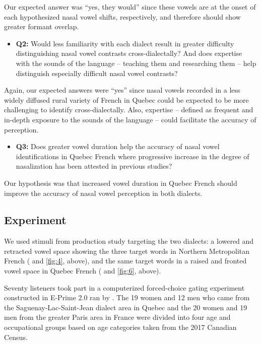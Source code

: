 \documentclass[output=paper,colorlinks,citecolor=brown]{langscibook}
\begin{document}
Our expected answer was ``yes, they would'' since these vowels are at the onset of each hypothesized nasal vowel shifts, respectively, and therefore should show greater formant overlap.

\begin{itemize}
    \item \textbf{Q2:} Would less familiarity with each dialect result in greater difficulty distinguishing nasal vowel contrasts cross-dialectally? And does expertise with the sounds of the language -- teaching them and researching them -- help distinguish especially difficult nasal vowel contrasts?
\end{itemize}

Again, our expected answers were ``yes'' since nasal vowels recorded in a less widely diffused rural variety of French in Quebec could be expected to be more challenging to identify cross-dialectally. Also, expertise -- defined as frequent and in-depth exposure to the sounds of the language -- could facilitate the accuracy of perception.

\begin{itemize}
    \item \textbf{Q3:} Does greater vowel duration help the accuracy of nasal vowel identifications in Quebec French where progressive increase in the degree of nasalization has been attested in previous studies?
\end{itemize}

Our hypothesis was that increased vowel duration in Quebec French should improve the accuracy of nasal vowel perception in both dialects.

\subsection{Experiment}
We used stimuli from  production study targeting the two dialects: a lowered and retracted vowel space showing the three target words in Northern Metropolitan French ( and \ref{fig:4}, above), and the same target words in a raised and fronted vowel space in Quebec French ( and \ref{fig:6}, above).

Seventy listeners took part in a computerized forced-choice gating experiment constructed in E-Prime 2.0 ran by \citet{Nicholas2018}. The 19 women and 12 men who came from the Saguenay-Lac-Saint-Jean dialect area in Quebec and the 20 women and 19 men from the greater Paris area in France were divided into four age and occupational groups based on age categories taken from the 2017 Canadian Census.
\end{document}
